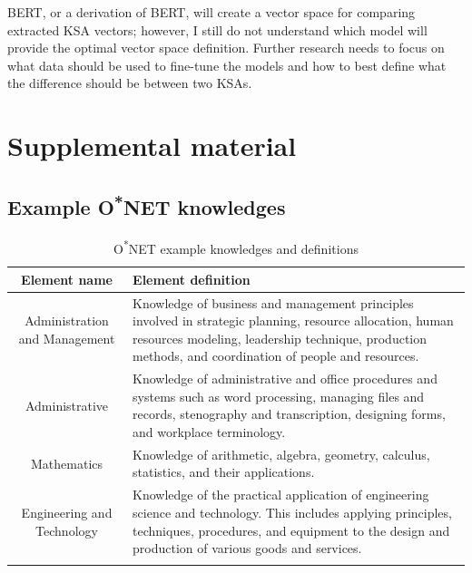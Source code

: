 \documentclass[12pt]{article}
\begin{document}
BERT, or a derivation of BERT, will create a vector space for comparing extracted KSA vectors; however, I still do not understand which model will provide the optimal vector space definition. Further research needs to focus on what data should be used to fine-tune the models and how to best define what the difference should be between two KSAs.

  

\clearpage

\section{Supplemental material}

\subsection{Example O\textsuperscript{*}NET knowledges}

\begin{table}[ht!]
    \centering
    \vspace*{4mm}
    \begin{tabular}{c | >{\RaggedRight} m{10cm}} 
        \Xhline{3\arrayrulewidth}
        Element name & Element definition \\\hline\hline
        Administration and Management & Knowledge of business and management principles involved in strategic planning, resource allocation, human resources modeling, leadership technique, production methods, and coordination of people and resources. \\
        Administrative & Knowledge of administrative and office procedures and systems such as word processing, managing files and records, stenography and transcription, designing forms, and workplace terminology. \\
        Mathematics & Knowledge of arithmetic, algebra, geometry, calculus, statistics, and their applications. \\
        Engineering and Technology & Knowledge of the practical application of engineering science and technology. This includes applying principles, techniques, procedures, and equipment to the design and production of various goods and services. \\
        \Xhline{3\arrayrulewidth}
    \end{tabular}
    \caption{O\textsuperscript{*}NET example knowledges and definitions}\label{tab:knowledge_examples}
\end{table}
\end{document}

